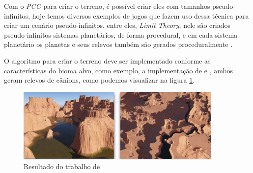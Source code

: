 Com o \textit{PCG} para criar o terreno, é possível criar eles com tamanhos
pseudo-infinitos, hoje temos diversos exemplos de jogos que fazem uso dessa técnica
para criar um cenário pseudo-infinitos, entre eles, \textit{Limit Theory}, nele
são criados pseudo-infinitos sistemas planetários, de forma procedural, e em cada
sistema planetário os planetas e seus relevos também são gerados proceduralmente
\cite{abreu1990toward}.

O algoritmo para criar o terreno deve ser implementado conforme as
características do bioma alvo, como exemplo, a implementação de 
\cite{gabrielle2016canion} e \cite{carli2012canion}, ambos geram relevos de
cânions, como podemos visualizar na figura \ref{fig:carli2012result}.
\begin{figure}[h]
    \captionsetup{justification=raggedright, singlelinecheck=false}
    \centering
    \includegraphics[width=0.9\textwidth]{figuras/carli2012result.png}
    \caption{Resultado do trabalho de \cite{carli2012canion}}
    \label{fig:carli2012result}
\end{figure}

